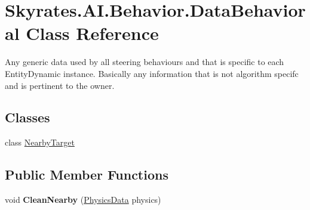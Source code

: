 \hypertarget{class_skyrates_1_1_a_i_1_1_behavior_1_1_data_behavioral}{\section{Skyrates.\-A\-I.\-Behavior.\-Data\-Behavioral Class Reference}
\label{class_skyrates_1_1_a_i_1_1_behavior_1_1_data_behavioral}
}


Any generic data used by all steering behaviours and that is specific to each Entity\-Dynamic instance. Basically any information that is not algorithm specifc and is pertinent to the owner.  


\subsection*{Classes}
\begin{DoxyCompactItemize}
\item 
class \hyperlink{class_skyrates_1_1_a_i_1_1_behavior_1_1_data_behavioral_1_1_nearby_target}{Nearby\-Target}
\end{DoxyCompactItemize}
\subsection*{Public Member Functions}
\begin{DoxyCompactItemize}
\item 
\hypertarget{class_skyrates_1_1_a_i_1_1_behavior_1_1_data_behavioral_a840ea45df20ca9c11e6e5375d6478fb5}{void {\bfseries Clean\-Nearby} (\hyperlink{class_skyrates_1_1_physics_1_1_physics_data}{Physics\-Data} physics)}\label{class_skyrates_1_1_a_i_1_1_behavior_1_1_data_behavioral_a840ea45df20ca9c11e6e5375d6478fb5}

\end{DoxyCompactItemize}
